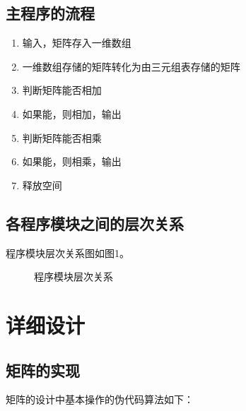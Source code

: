 \documentclass{article}
\begin{document}
\subsection{主程序的流程}

\begin{enumerate}
    \item 输入，矩阵存入一维数组
    \item 一维数组存储的矩阵转化为由三元组表存储的矩阵
    \item 判断矩阵能否相加
    \item 如果能，则相加，输出
    \item 判断矩阵能否相乘
    \item 如果能，则相乘，输出
    \item 释放空间
\end{enumerate}

\subsection{各程序模块之间的层次关系}

程序模块层次关系图如图1。

\begin{figure}[htbp]


    \caption{程序模块层次关系}

\end{figure}

\section{详细设计}

\subsection{矩阵的实现}

矩阵的设计中基本操作的伪代码算法如下：
\end{document}

